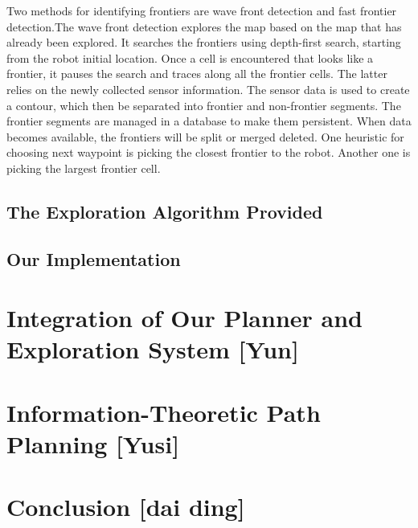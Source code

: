 \documentclass{article}
\begin{document}
Two methods for identifying frontiers are wave front detection and fast frontier detection.The wave front detection explores the map based on the map that has already been explored. It searches the frontiers using depth-first search, starting from the robot initial location. Once a cell is encountered that looks like a frontier, it pauses the search and traces along all the frontier cells. The latter relies on the newly collected sensor information. The sensor data is used to create a contour, which then be separated into frontier and non-frontier segments. The frontier segments are managed in a database to make them persistent. When data becomes available, the frontiers will be split or merged deleted. One heuristic for choosing next waypoint is picking the closest frontier to the robot. Another one is picking the largest frontier cell.


\subsection {The Exploration Algorithm Provided}

\subsection {Our Implementation}

\section{Integration of Our Planner and Exploration System [Yun]}

\section{Information-Theoretic Path Planning [Yusi]}

\section{Conclusion [dai ding]}

  


\begin{thebibliography}{1}

\end{thebibliography}


\end{document}
